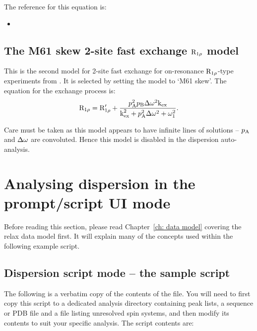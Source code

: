The reference for this equation is:
\begin{itemize}
\item {}
\end{itemize}



\subsection{The M61 skew 2-site fast exchange $\mathrm{R}_{1\rho}$ model}

This is the second model for 2-site fast exchange for on-resonance $\mathrm{R}_{1\rho}$-type experiments from \citet{Meiboom61}.  It is selected by setting the model to `M61 skew'.  The equation for the exchange process is:
\begin{equation}
    \mathrm{R}_{1\rho} = \mathrm{R}_{1\rho}' + \frac{p_\textrm{A}^2p_\textrm{B}\Delta\omega^2\textrm{k}_\textrm{ex}}{\textrm{k}_\textrm{ex}^2 + p_\textrm{A}^2\Delta\omega^2 + \omega_1^2} .
\end{equation}

Care must be taken as this model appears to have infinite lines of solutions -- $p_\textrm{A}$ and $\Delta\omega$ are convoluted.  Hence this model is disabled in the dispersion auto-analysis.



\section{Analysing dispersion in the prompt/script UI mode}

Before reading this section, please read Chapter~\ref{ch: data model} covering the relax data model first.  It will explain many of the concepts used within the following example script.



\subsection{Dispersion script mode -- the sample script}

The following is a verbatim copy of the contents of the  file.
You will need to first copy this script to a dedicated analysis directory containing peak lists, a sequence or PDB file and a file listing unresolved spin systems, and then modify its contents to suit your specific analysis.
The script contents are:

